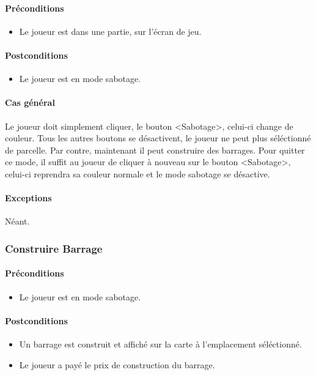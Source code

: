\documentclass[a4paper,11pt]{report}
\begin{document}
\paragraph{Préconditions}
\begin{itemize}
	\item Le joueur est dans une partie, sur l'écran de jeu.
\end{itemize}
\paragraph{Postconditions}
\begin{itemize}
	\item Le joueur est en mode sabotage.
\end{itemize}
\paragraph{Cas général}
Le joueur doit simplement cliquer, le bouton <Sabotage>, celui-ci change de couleur. Tous les autres boutons se désactivent, le joueur ne peut plus séléctionné de parcelle. Par contre, maintenant il peut construire des barrages.
Pour quitter ce mode, il suffit au joueur de cliquer à nouveau sur le bouton <Sabotage>, celui-ci reprendra sa couleur normale et le mode sabotage se désactive.
\paragraph{Exceptions} Néant.

\subsubsection{Construire Barrage}
\paragraph{Préconditions}
\begin{itemize}
	\item Le joueur est en mode sabotage.
\end{itemize}
\paragraph{Postconditions}
\begin{itemize}
	\item Un barrage est construit et affiché sur la carte à l'emplacement séléctionné.
	\item Le joueur a payé le prix de construction du barrage.
\end{itemize}
\end{document}
